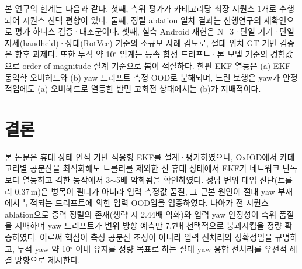 \documentclass{kcc}
\begin{document}
본 연구의 한계는 다음과 같다. 첫째, 측위 평가가 카테고리당 최장 시퀀스 1개로 수행되어 시퀀스 선택 편향이 있다. 둘째, 정렬 ablation 일차 결과는 선행연구의 재확인으로 평가 하니스 검증·대조군이다. 셋째, 실측 Android 재현은 N=3·단일 기기·단일 자세(handheld)·상대(RotVec) 기준의 소규모 사례 검토로, 절대 위치 GT 기반 검증은 향후 과제다. 또한 누적 약 10$^\circ$ 임계는 등속 합성 드리프트·본 모델 기준의 경험값으로 order-of-magnitude 설계 기준으로 봄이 적절하다. 한편 EKF 열등은 (a) EKF 동역학 오버헤드와 (b) yaw 드리프트 측정 OOD로 분해되며, 느린 보행은 yaw가 안정적임에도 (a) 오버헤드로 열등한 반면 고회전 상태에서는 (b)가 지배적이다.

\section{결론}
본 논문은 휴대 상태 인식 기반 적응형 EKF를 설계·평가하였으나, OxIOD에서 카테고리별 공분산을 최적화해도 트롤리를 제외한 전 휴대 상태에서 EKF가 네트워크 단독보다 열등하고 격한 동작에서 3$\sim$5배 악화됨을 확인하였다. 정답 변위 대입 진단(트롤리 0.37\,m)은 병목이 필터가 아니라 입력 측정값 품질, 그 근본 원인이 절대 yaw 부재에서 누적되는 드리프트에 의한 입력 OOD임을 입증하였다. 나아가 전 시퀀스 ablation으로 중력 정렬의 존재(생략 시 2.44배 악화)와 입력 yaw 안정성이 측위 품질을 지배하며 yaw 드리프트가 변위 방향 예측만 7.7배 선택적으로 붕괴시킴을 정량 확증하였다. 이로써 핵심이 측정 공분산 조정이 아니라 입력 전처리의 정확성임을 규명하고, 누적 yaw 약 10$^\circ$ 이내 유지를 정량 목표로 하는 절대 yaw 융합 전처리를 우선적 해결 방향으로 제시한다.



\end{document}
